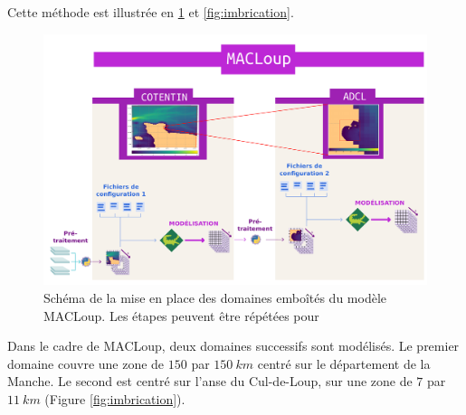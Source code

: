 \documentclass[10pt,a4paper,titlepage]{article}
\begin{document}
    Cette méthode est illustrée en \ref{fig:imbrication_workflow} et \ref{fig:imbrication}.
    
    \begin{figure}[h!]
        \centering
        \includegraphics[scale=0.3]{../images/workflow/multi_grid.pdf}
        \caption{Schéma de la mise en place des domaines emboîtés du modèle MACLoup. Les étapes peuvent être répétées pour }
        \label{fig:imbrication_workflow}
    \end{figure}
    
    Dans le cadre de MACLoup, deux domaines successifs sont modélisés.
    Le premier domaine couvre une zone de $150$ par $150~km$ centré sur le département de la Manche.
    Le second est centré sur l'anse du Cul-de-Loup, sur une zone de $7$ par $11~km$ (Figure \ref{fig:imbrication}).
    
    
\end{document}
